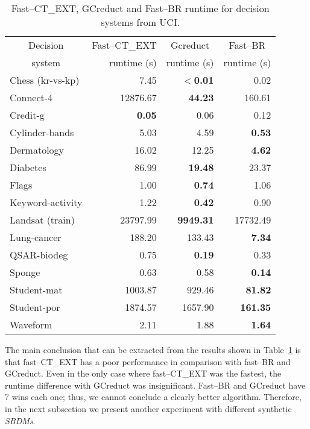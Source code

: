 \documentclass[number,preprint,review,12pt]{elsarticle}
\begin{document}
	\begin{table}[htb]
		\centering 
		\caption{Fast--CT\_EXT, GCreduct and Fast--BR runtime for decision systems from UCI.}
		\label{tab:java}
		\begin{tabular}{|l|r|r|r|}
			\hline
			\multicolumn{1}{|c|}{Decision}  &\multicolumn{1}{c|}{Fast--CT\_EXT} & \multicolumn{1}{c|}{Gcreduct} & \multicolumn{1}{c|}{Fast--BR}  \\
			\multicolumn{1}{|c|}{system} & runtime (s) & runtime (s)  & runtime (s) \\
			\hline
			Chess (kr-vs-kp) & 7.45          & \textbf{$<$0.01} & 0.02            \\
			Connect-4        & 12876.67      & \textbf{44.23}   & 160.61          \\
			Credit-g         & \textbf{0.05} & 0.06             & 0.12            \\
			Cylinder-bands   & 5.03          & 4.59             & \textbf{0.53}   \\
			Dermatology      & 16.02         & 12.25            & \textbf{4.62}   \\
			Diabetes         & 86.99         & \textbf{19.48}   & 23.37           \\
			Flags            & 1.00          & \textbf{0.74}    & 1.06            \\
			Keyword-activity & 1.22          & \textbf{0.42}    & 0.90            \\
			Landsat (train)  & 23797.99      & \textbf{9949.31} & 17732.49        \\
			Lung-cancer      & 188.20        & 133.43           & \textbf{7.34}   \\
			QSAR-biodeg      & 0.75          & \textbf{0.19}    & 0.33            \\
			Sponge           & 0.63          & 0.58             & \textbf{0.14}   \\
 			Student-mat      & 1003.87       & 929.46           & \textbf{81.82}  \\
			Student-por      & 1874.57       & 1657.90          & \textbf{161.35} \\
			Waveform         & 2.11          & 1.88             & \textbf{1.64}   \\
			\hline
		\end{tabular}
	\end{table}

    The main conclusion that can be extracted from the results shown in Table~\ref{tab:java} is that fast--CT\_EXT has a poor performance in comparison with fast--BR and GCreduct. Even in the only case where fast--CT\_EXT was the fastest, the runtime difference with GCreduct was insignificant. Fast--BR and GCreduct have 7 wins each one; thus, we cannot conclude a clearly better algorithm. Therefore, in the next subsection we present another experiment with different synthetic \textit{SBDMs}.
    
\end{document}
